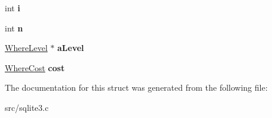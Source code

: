 \begin{DoxyCompactItemize}
\item 
\hypertarget{struct_where_best_idx_aba589fab1fce7564798de57377576e61}{int {\bfseries i}}\label{struct_where_best_idx_aba589fab1fce7564798de57377576e61}

\item 
\hypertarget{struct_where_best_idx_a76dc5c876fd469799daa454491a8f24c}{int {\bfseries n}}\label{struct_where_best_idx_a76dc5c876fd469799daa454491a8f24c}

\item 
\hypertarget{struct_where_best_idx_ad040595088167954f1b3dd91e0a5dcfe}{\hyperlink{struct_where_level}{Where\-Level} $\ast$ {\bfseries a\-Level}}\label{struct_where_best_idx_ad040595088167954f1b3dd91e0a5dcfe}

\item 
\hypertarget{struct_where_best_idx_a1aadc3c24a8e0f9f64763d44b9379ca6}{\hyperlink{struct_where_cost}{Where\-Cost} {\bfseries cost}}\label{struct_where_best_idx_a1aadc3c24a8e0f9f64763d44b9379ca6}

\end{DoxyCompactItemize}


The documentation for this struct was generated from the following file\-:\begin{DoxyCompactItemize}
\item 
src/sqlite3.\-c\end{DoxyCompactItemize}
